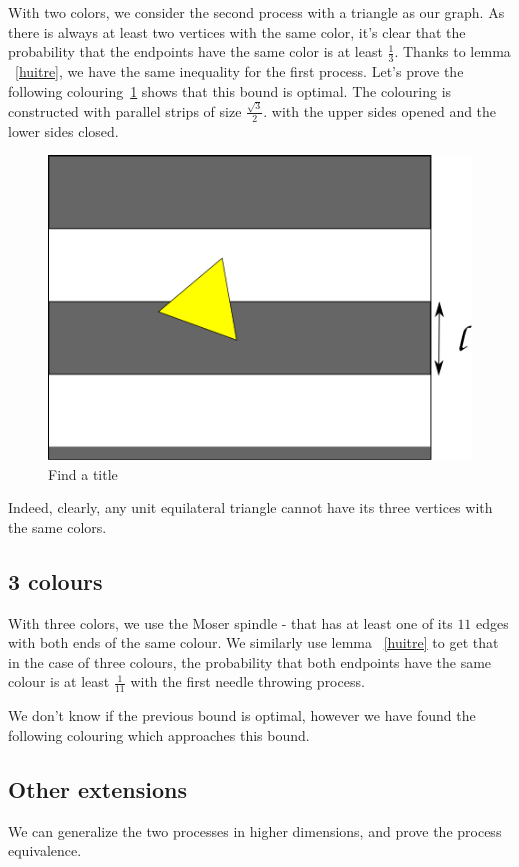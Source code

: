 \documentclass[a4paper,11pt]{article}
\theoremstyle{definition}
\theoremstyle{remark}
\begin{document}
With two colors, we consider the second process with a triangle as our graph. As there is always
 at least two vertices with the same color, it's clear that the 
probability that the endpoints have the same color is at least $\frac{1}{3}$. Thanks to lemma ~\ref{huitre}, we have the same inequality for the first process.
Let's prove the following colouring~\ref{color} shows that this bound is optimal. 
The colouring is constructed with parallel strips of size $\frac {\sqrt3}
2.$ with the upper sides opened and the lower sides closed.   
\begin{figure}[h]
\center
\includegraphics[scale=0.5]{path6509.png}
\caption{\label{color} Find a title}
\end{figure}

Indeed, clearly, any unit equilateral triangle cannot have its three vertices
with the same colors.

\subsection{3 colours}

 With three colors, we use the Moser spindle - that has at least one of its $11$ edges with both ends of the same colour.
 We similarly use lemma ~\ref{huitre} to get that in the case of three colours,
 the probability that both endpoints have the same colour is at least $\frac{1}{11}$ with the first needle throwing process. 

We don't know if the previous bound is optimal, however we have found the
following colouring which approaches this bound.
  

\subsection{Other extensions}
\label{dim}
We can generalize the two processes in higher dimensions, and prove the
process equivalence. %
\end{document}
